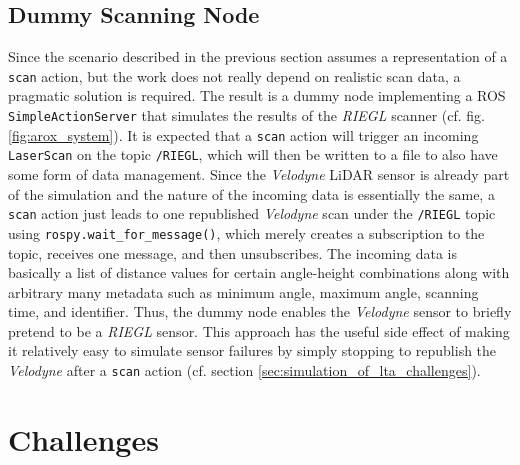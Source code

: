 \documentclass[english, master, utf8]{base/thesis_KBS}
\newcommand{\code}[1]{\colorbox{light-gray}{\texttt{#1}}}
\begin{document}
\subsection{Dummy Scanning Node}
\label{sec:dummy_scanning_node}

Since the scenario described in the previous section assumes a representation of a \code{scan} action, but the work does not really depend on realistic scan data,
a pragmatic solution is required. The result is a dummy node implementing a ROS \code{SimpleActionServer} that simulates the results of the \textit{RIEGL} scanner
(cf. fig. \ref{fig:arox_system}). It is expected that a \code{scan} action will trigger an incoming \code{LaserScan} on the topic \code{/RIEGL}, which will then be
written to a file to also have some form of data management. Since the \textit{Velodyne} LiDAR sensor is already part of the simulation and the nature of the incoming data
is essentially the same, a \code{scan} action just leads to one republished \textit{Velodyne} scan under the \code{/RIEGL} topic using \code{rospy.wait\_for\_message()},
which merely creates a subscription to the topic, receives one message, and then unsubscribes. The incoming data is basically a list of distance values for certain angle-height 
combinations along with arbitrary many metadata such as minimum angle, maximum angle, scanning time, and identifier. Thus, the dummy node enables the \textit{Velodyne} sensor
to briefly pretend to be a \textit{RIEGL} sensor. This approach has the useful side effect of making it relatively easy to simulate sensor failures by simply stopping to
republish the \textit{Velodyne} after a \code{scan} action (cf. section \ref{sec:simulation_of_lta_challenges}).

\pagebreak

\section{Challenges}
\label{sec:challenges_for_lta}
\end{document}
